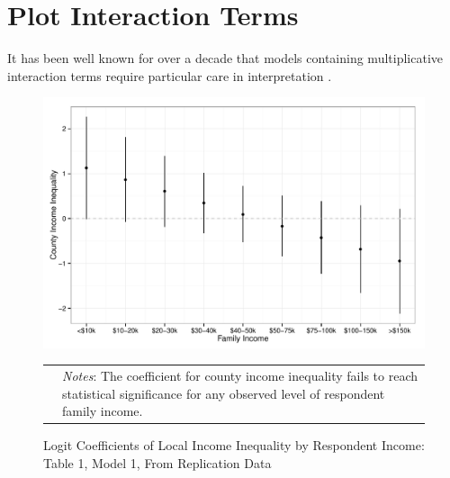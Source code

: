 
\section{Plot Interaction Terms}

It has been well known for over a decade that models containing multiplicative interaction terms require particular care in interpretation \citep[see, e.g.,][]{Golder2003a, Braumoeller2004, Brambor2006, Kam2007a}.



\begin{figure}[htbp] 
  \caption{Logit Coefficients of Local Income Inequality by Respondent Income: Table 1, Model 1, From Replication Data}
  \label{F:coef.t1m1}
  \begin{center}
    \includegraphics[width=5.25in]{../figures/07_plot_interaction_terms_t1m1.pdf}
  \end{center}
  \begin{footnotesize}
  \begin{tabular}{p{.1in} p{5.1in}}
  & \emph{Notes}: The coefficient for county income inequality fails to reach statistical significance for any observed level of respondent family income.
  \end{tabular}
  \end{footnotesize}
\end{figure}


